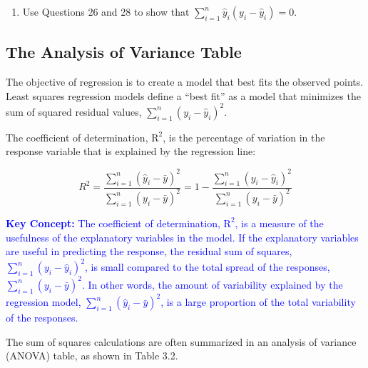\documentclass[
]{book}
\providecommand{\tightlist}{%
  \setlength{\itemsep}{0pt}\setlength{\parskip}{0pt}}
\begin{document}
\begin{enumerate}
\def\labelenumi{\arabic{enumi}.}
\setcounter{enumi}{28}
\tightlist
\item
  Use Questions 26 and 28 to show that \(\sum_{i=1}^n \hat{y}_i (y_i - \hat{y}_i) = 0.\)
\end{enumerate}

\hypertarget{the-analysis-of-variance-table}{%
\subsection*{The Analysis of Variance Table}\label{the-analysis-of-variance-table}}

The objective of regression is to create a model that best fits the observed points. Least squares regression models define a ``best fit'' as a model that minimizes the sum of squared residual values, \(\sum_{i=1}^n (y_i - \hat{y}_i)^2\).

The coefficient of determination, \(\mathrm{R}^2\), is the percentage of variation in the response variable that is explained by the regression line:

\begin{equation} 
 R^2 = \frac{\sum_{i=1}^n (\hat{y}_i - \bar{y})^2}{\sum_{i=1}^n (y_i - \bar{y})^2} 
     = 1 - \frac{\sum_{i=1}^n (y_i - \hat{y}_i)^2}{\sum_{i=1}^n (y_i - \bar{y})^2} 
 \tag{3.10} 
 \end{equation}

\textbf{\textcolor{blue}{Key Concept:}}
\textcolor{blue}{The coefficient of determination, $\mathrm{R}^2$, is a measure of the usefulness of the explanatory variables in the model. If the explanatory variables are useful in predicting the response, the residual sum of squares, $\sum_{i=1}^n (y_i - \hat{y}_i)^2$, is small compared to the total spread of the responses, $\sum_{i=1}^n (y_i - \bar{y})^2$. In other words, the amount of variability explained by the regression model, $\sum_{i=1}^n (\hat{y}_i - \bar{y})^2$, is a large proportion of the total variability of the responses.}

The sum of squares calculations are often summarized in an analysis of variance (ANOVA) table, as shown in Table 3.2.
\end{document}
